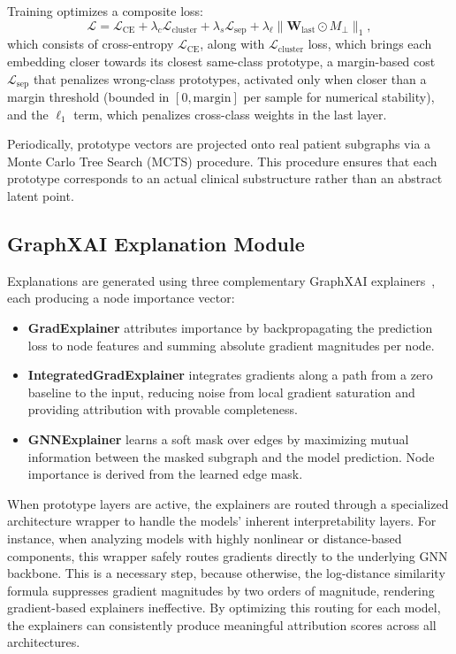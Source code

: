 Training optimizes a composite loss:
\[
  \mathcal{L} = \mathcal{L}_{\mathrm{CE}}
              + \lambda_c \mathcal{L}_{\mathrm{cluster}}
              + \lambda_s \mathcal{L}_{\mathrm{sep}}
              + \lambda_\ell \|\mathbf{W}_{\mathrm{last}}
                               \odot M_\perp\|_1,
\]
which consists of cross-entropy $\mathcal{L}_{\mathrm{CE}}$, along with $\mathcal{L}_{\mathrm{cluster}}$ loss, which brings each embedding closer towards its closest same-class prototype, a margin-based cost $\mathcal{L}_{\mathrm{sep}}$ that penalizes wrong-class prototypes, activated only when closer than a margin threshold (bounded in $[0, \text{margin}]$ per sample for numerical stability), and the $\ell_1$ term, which penalizes cross-class weights in the last layer.

Periodically, prototype vectors are projected onto real patient subgraphs via a Monte Carlo Tree Search (MCTS) procedure. This procedure ensures that each prototype corresponds to an actual clinical substructure rather than an abstract latent point.

\subsection{GraphXAI Explanation Module}

Explanations are generated using three complementary GraphXAI
explainers~\cite{agarwal2023graphxai}, each producing a node importance vector:

\begin{itemize}
  \item \textbf{GradExplainer} attributes importance by backpropagating the prediction loss to node features and summing absolute gradient magnitudes per node.

  \item \textbf{IntegratedGradExplainer} integrates gradients along a path from a zero baseline to the input, reducing noise from local gradient saturation and providing attribution with provable completeness.

  \item \textbf{GNNExplainer} learns a soft mask over edges by maximizing mutual information between the masked subgraph and the model prediction. Node importance is derived from the learned edge mask.
\end{itemize}

When prototype layers are active, the explainers are routed through a specialized architecture wrapper to handle the models' inherent interpretability layers. For instance, when analyzing models with highly nonlinear or distance-based components, this wrapper safely routes gradients directly to the underlying GNN backbone. This is a necessary step, because otherwise, the log-distance similarity formula suppresses gradient magnitudes by two orders of magnitude, rendering gradient-based explainers ineffective. By optimizing this routing for each model, the explainers can consistently produce meaningful attribution scores across all architectures.


